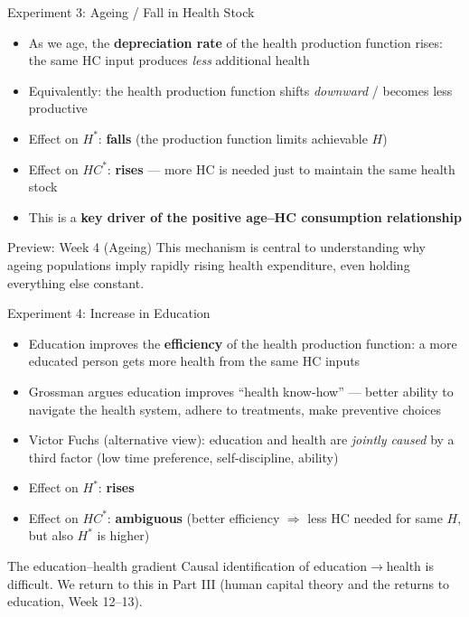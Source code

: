 \documentclass[aspectratio=169, 12pt]{beamer}
\begin{document}
\begin{frame}{Experiment 3: Ageing / Fall in Health Stock}
  \begin{itemize}
    \item As we age, the \textbf{depreciation rate} of the health production function rises:
          the same HC input produces \emph{less} additional health
    \item Equivalently: the health production function shifts \emph{downward} / becomes less
          productive
    \item Effect on \textbf{$H^*$}: \textcolor{OtagoGold!80!black}{\textbf{falls}} (the production function limits achievable $H$)
    \item Effect on \textbf{$HC^*$}: \textcolor{OtagoBlue}{\textbf{rises}} --- more HC is needed just to maintain the same health stock
    \item This is a \textbf{key driver of the positive age--HC consumption relationship}
  \end{itemize}
  \begin{alertblock}{Preview: Week 4 (Ageing)}
    This mechanism is central to understanding why ageing populations imply rapidly rising
    health expenditure, even holding everything else constant.
  \end{alertblock}
\end{frame}

\begin{frame}{Experiment 4: Increase in Education}
  \begin{itemize}
    \item Education improves the \textbf{efficiency} of the health production function:
          a more educated person gets more health from the same HC inputs
    \item Grossman argues education improves ``health know-how'' --- better ability to
          navigate the health system, adhere to treatments, make preventive choices
    \item Victor Fuchs (alternative view): education and health are \emph{jointly caused}
          by a third factor (low time preference, self-discipline, ability)
    \item Effect on \textbf{$H^*$}: \textcolor{OtagoBlue}{\textbf{rises}}
    \item Effect on \textbf{$HC^*$}: \textbf{ambiguous} (better efficiency $\Rightarrow$ less HC needed for same $H$, but also $H^*$ is higher)
  \end{itemize}
  \begin{block}{The education--health gradient}
    Causal identification of education$\rightarrow$health is difficult. We return to
    this in Part III (human capital theory and the returns to education, Week 12--13).
  \end{block}
\end{frame}
\end{document}
